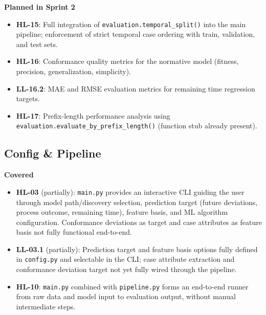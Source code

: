 \documentclass[12pt,a4paper]{article}
\begin{document}
\noindent \textbf{Planned in Sprint 2}
\begin{itemize}
    \item \textbf{HL-15}: Full integration of \texttt{evaluation.temporal\_split()} into the main pipeline; enforcement of strict temporal case ordering with train, validation, and test sets.
    \item \textbf{HL-16}: Conformance quality metrics for the normative model (fitness, precision, generalization, simplicity).
    \item \textbf{LL-16.2}: MAE and RMSE evaluation metrics for remaining time regression targets.
    \item \textbf{HL-17}: Prefix-length performance analysis using \texttt{evaluation.evaluate\_by\_prefix\_length()} (function stub already present).
\end{itemize}

\subsection{Config \& Pipeline}

\textbf{Covered}
\begin{itemize}
    \item \textbf{HL-03} (partially): \texttt{main.py} provides an interactive CLI guiding the user through model path/discovery selection, prediction target (future deviations, process outcome, remaining time), feature basis, and ML algorithm configuration. Conformance deviations as target and case attributes as feature basis not fully functional end-to-end.
    \item \textbf{LL-03.1} (partially): Prediction target and feature basis options fully defined in \texttt{config.py} and selectable in the CLI; case attribute extraction and conformance deviation target not yet fully wired through the pipeline.
    \item \textbf{HL-10}: \texttt{main.py} combined with \texttt{pipeline.py} forms an end-to-end runner from raw data and model input to evaluation output, without manual intermediate steps.
\end{itemize}
\end{document}

